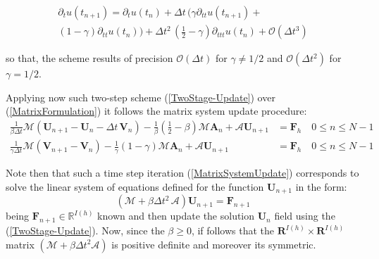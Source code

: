 \begin{multline}
    \partial_{t} u(t_{n+1}) = \partial_{t} u(t_n) + \Delta t\, \big( \gamma \partial_{tt} u(t_{n+1}) + \\
    (1-\gamma) \partial_{tt}u(t_n) \big) + \Delta t^2 \, (\frac{1}{2}-\gamma) \partial_{ttt} u(t_n) + \mathcal{O}(\Delta t^3)
\end{multline}

so that, the scheme results of precision $\mathcal{O}(\Delta t)$ for $\gamma \neq 1/2$ and $\mathcal{O}(\Delta t^2)$ for $\gamma = 1/2$.

Applying now such two-step scheme (\ref{TwoStage-Update}) over (\ref{MatrixFormulation}) it follows the matrix system update procedure:
\begin{align}
    \label{MatrixSystemUpdate}
    \frac{1}{\beta \Delta t} \mathcal{M}(\mathbf{U}_{n+1} - \mathbf{U}_{n} - \Delta t\, \mathbf{V}_n) - \frac{1}{\beta}(\frac{1}{2}- \beta) \mathcal{M}\mathbf{A}_n + \mathcal{A}\mathbf{U}_{n+1} &= \mathbf{F}_h \quad 0 \leq n \leq N-1 \\
    \frac{1}{\gamma \Delta t} \mathcal{M}(\mathbf{V}_{n+1} - \mathbf{V}_{n}) - \frac{1}{\gamma}(1-\gamma) \mathcal{M}\mathbf{A}_n + \mathcal{A}\mathbf{U}_{n+1} & = \mathbf{F}_h \quad 0 \leq n \leq N-1
\end{align}

Note then that such a time step iteration (\ref{MatrixSystemUpdate}) corresponds to solve the linear system of equations defined for the function $\mathbf{U}_{n+1}$ in the form:
\begin{equation*}
    (\mathcal{M}+ \beta \Delta t^2 \, \mathcal{A}) \mathbf{U}_{n+1} = \mathbf{F}_{n+1}
\end{equation*}
being $\mathbf{F}_{n+1} \in \mathbb{R}^{I(h)}$ known and then update the solution $\mathbf{U}_n$ field using the (\ref{TwoStage-Update}).
Now, since the $\beta \geq 0$, if follows that the $\mathbf{R}^{I(h)} \times \mathbf{R}^{I(h)}$ matrix $(\mathcal{M}+ \beta \Delta t^2 \mathcal{A})$ is positive definite and moreover its symmetric. 


